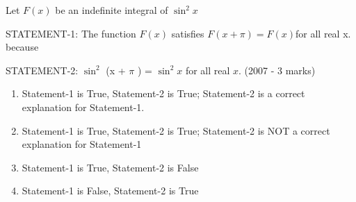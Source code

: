 \iffalse
\title{Assignment}
\author{K.AKSHAY TEJA}
\section{ar}
\fi

\item   Let $F(x)$ be an indefinite integral of $\sin^2 x$

STATEMENT-1: The function $F(x)$ satisfies $F(x+\pi)=F(x)$for all real x. because

STATEMENT-2: $\sin^2$ (x + $\pi$ ) = $\sin^2 x$ for all real $x$.   \hfill     (2007 - 3 marks)
  
    \begin{enumerate}
    
 \item Statement-1 is True, Statement-2 is True; Statement-2 is a correct explanation for Statement-1.
\item Statement-1 is True, Statement-2 is True; Statement-2 is NOT a correct explanation for Statement-1
 \item Statement-1 is True, Statement-2 is False
\item Statement-1 is False, Statement-2 is True
\end{enumerate}
